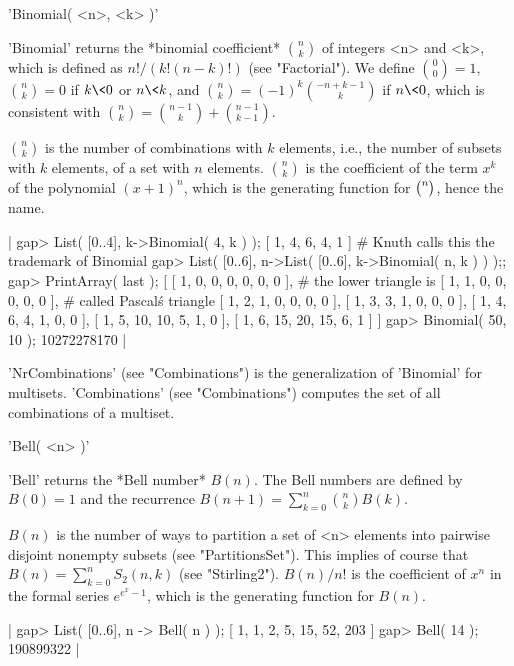 'Binomial( <n>, <k> )'

'Binomial' returns the *binomial coefficient* ${n \choose k}$ of integers
<n> and <k>, which  is defined as $n!  / (k!  (n-k)!)$ (see "Factorial").
We define ${0 \choose 0} = 1$, ${n \choose  k} = 0$  if $k\<0$ or $n\<k$,
and ${n \choose k} = (-1)^k {-n+k-1  \choose  k}$ if  $n \<  0$, which is
consistent with ${n \choose k} = {n-1 \choose k} + {n-1 \choose k-1}$.

${n \choose k}$ is the number of combinations with  $k$  elements,  i.e.,
the number of subsets with $k$ elements, of  a  set  with  $n$  elements.
${n \choose k}$  is the coefficient of the  term $x^k$ of the  polynomial
$(x + 1)^n$, which is the generating function for ${n \choose \*}$, hence
the name.

|    gap> List( [0..4], k->Binomial( 4, k ) );
    [ 1, 4, 6, 4, 1 ]    # Knuth calls this the trademark of Binomial
    gap> List( [0..6], n->List( [0..6], k->Binomial( n, k ) ) );;
    gap> PrintArray( last );
    [ [   1,   0,   0,   0,   0,   0,   0 ],    # the lower triangle is
      [   1,   1,   0,   0,   0,   0,   0 ],    # called Pascal\'s triangle
      [   1,   2,   1,   0,   0,   0,   0 ],
      [   1,   3,   3,   1,   0,   0,   0 ],
      [   1,   4,   6,   4,   1,   0,   0 ],
      [   1,   5,  10,  10,   5,   1,   0 ],
      [   1,   6,  15,  20,  15,   6,   1 ] ]
    gap> Binomial( 50, 10 );
    10272278170 |

'NrCombinations' (see "Combinations") is the generalization of 'Binomial'
for multisets.  'Combinations' (see "Combinations")  computes the set  of
all combinations of a multiset.

%

'Bell( <n> )'

'Bell' returns the *Bell number* $B(n)$.  The Bell numbers are defined by
$B(0)=1$ and the recurrence $B(n+1) = \sum_{k=0}^{n}{{n \choose k}B(k)}$.

$B(n)$ is the  number of ways to  partition a  set of <n>   elements into
pairwise disjoint  nonempty subsets  (see "PartitionsSet").  This implies
of  course that   $B(n) =  \sum_{k=0}^{n}{S_2(n,k)}$  (see  "Stirling2").
$B(n)/n!$ is the coefficient of  $x^n$ in the formal series  $e^{e^x-1}$,
which is the generating function for $B(n)$.

|    gap> List( [0..6], n -> Bell( n ) );
    [ 1, 1, 2, 5, 15, 52, 203 ]
    gap> Bell( 14 );
    190899322 |

